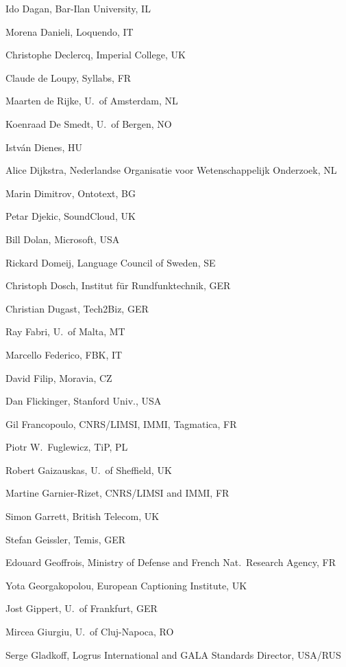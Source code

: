 \documentclass[10pt, plain]{../../metanetpaper}
\begin{document}
\begin{multicols}{3}
\begin{footnotesize}
\begin{enumerate}
{      \item Ido Dagan, Bar-Ilan University, IL
      \item Morena Danieli, Loquendo, IT
      \item Christophe Declercq, Imperial College, UK
      \item Claude de Loupy, Syllabs, FR
      \item Maarten de Rijke, U.~of Amsterdam, NL
      \item Koenraad De Smedt, U.~of Bergen, NO
      \item István Dienes, HU
      \item Alice Dijkstra, Nederlandse Organisatie voor Wetenschappelijk Onderzoek, NL
      \item Marin Dimitrov, Ontotext, BG
      \item Petar Djekic, SoundCloud, UK
      \item Bill Dolan, Microsoft, USA
      \item Rickard Domeij, Language Council of Sweden, SE
      \item Christoph Dosch, Institut für Rundfunktechnik, GER
      \item Christian Dugast, Tech2Biz, GER
      \item Ray Fabri, U.~of Malta, MT
      \item Marcello Federico, FBK, IT
      \item David Filip, Moravia, CZ
      \item Dan Flickinger, Stanford Univ., USA
      \item Gil Francopoulo, CNRS/LIMSI, IMMI, Tagmatica, FR
      \item Piotr W.~Fuglewicz, TiP, PL
      \item Robert Gaizauskas, U.~of Sheffield, UK
      \item Martine Garnier-Rizet, CNRS/LIMSI and IMMI, FR
      \item Simon Garrett, British Telecom, UK
      \item Stefan Geissler, Temis, GER
      \item Edouard Geoffrois, Ministry of Defense and French Nat.~Research Agency, FR
      \item Yota Georgakopolou, European Captioning Institute, UK
      \item Jost Gippert, U.~of Frankfurt, GER
      \item Mircea Giurgiu, U.~of Cluj-Napoca, RO
      \item Serge Gladkoff, Logrus International and GALA Standards Director, USA/RUS
}
\end{enumerate}
\end{footnotesize}
\end{multicols}
\end{document}
